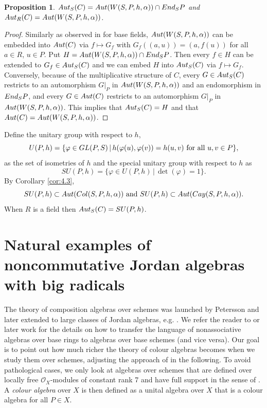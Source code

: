 \documentclass[10pt]{amsart}
\theoremstyle{plain}
\newtheorem{proposition}[theorem]{Proposition}
\theoremstyle{definition}
\begin{document}
\begin{proposition}
  ${\rm Aut}_S(C)={\rm Aut}(W(S, P,h,\alpha))\cap {\rm End}_S{P}$ and ${\rm Aut}_R(C)={\rm Aut}(W(S, P,h,\alpha))$.
\end{proposition}

\begin{proof}
Similarly as observed in \cite[p.1301]{EM} for base fields, ${\rm Aut}(W(S, P,h,\alpha))$ can be embedded into  ${\rm Aut}(C)$ via $f\mapsto G_f$ with $G_f((a,u))=(a,f(u))$ for all $a\in R$, $u\in P$.
Put $H={\rm Aut}(W(S, P,h,\alpha))\cap {\rm End}_S{P}$. Then every $f\in H$ can be extended to $G_f\in {\rm Aut}_S(C)$ and we can embed $H$ into ${\rm Aut}_S(C)$ via $f\mapsto G_f$.
Conversely, because of the multiplicative structure of $C$, every $G\in {\rm Aut}_S(C)$ restricts to an automorphism $G|_P$ in ${\rm Aut}(W(S, P,h,\alpha))$ and an endomorphism in ${\rm End}_S{P}$, and every $G\in {\rm Aut}(C)$ restricts to an automorphism $G|_P$ in ${\rm Aut}(W(S, P,h,\alpha))$.
This implies that  ${\rm Aut}_S(C)=H$  and that ${\rm Aut}(C)={\rm Aut}(W(S, P,h,\alpha))$.
\end{proof}

Define the unitary group with respect to $h$,
$$U(P,h)=\{ \varphi\in {\rm GL}(P,S)\,|\, h(\varphi(u),\varphi(v))=h(u,v) \text{ for all }u,v\in P\},$$
as the set of isometries of $h$ and the special unitary group with respect to $h$ as
$$SU(P,h)=\{ \varphi\in U(P,h)\,|\, \det (\varphi)=1\}.$$
 By Corollary \ref{cor:4.3},
 $$SU(P,h)\subset {\rm Aut}({\rm Col}(S, P, h,\alpha)) \text{ and } SU(P,h)\subset{\rm Aut}({\rm Cay}(S, P, h,\alpha)).$$
When $R$ is a field then ${\rm Aut}_S(C)=SU(P,h)$.


\section{Natural examples of noncommutative Jordan algebras with big radicals} \label{sec:Jordan}

  The theory of  composition algebras over schemes was  launched by Petersson \cite{P2} and later extended to large classes of Jordan algebras, e.g. \cite{Ach1, Ach2, PST, PST2, Pu1}.
  We refer the reader to \cite{P2} or later work for the details on how to transfer the language of nonassociative algebras over base rings to algebras over base schemes (and vice versa). Our goal is to point out how much richer the theory of  colour algebras becomes when we study them over schemes, adjusting the approach of \cite[3.8]{P2} in the following. To avoid pathological cases, we only look at algebras over schemes that are defined over locally free $\mathcal{O}_X$-modules of constant rank 7 and have full support in the sense of \cite{P2}. A \emph{colour algebra} over $X$ is then defined as a unital algebra over $X$ that is a colour algebra for all $P\in X$.
\end{document}
